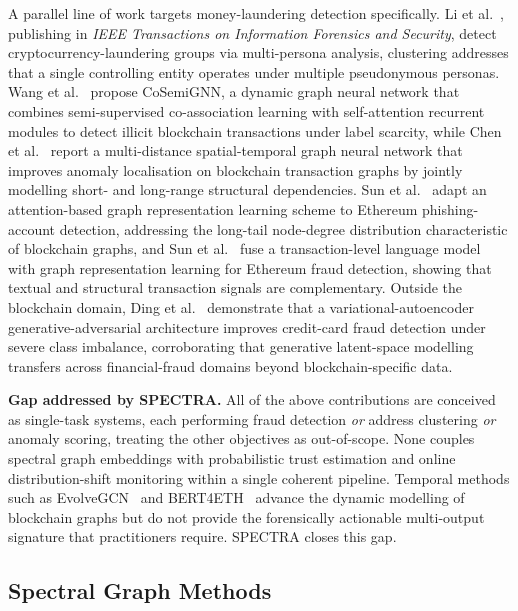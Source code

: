 \documentclass[journal]{IEEEtran}
\newcommand{\spectra}{\textsc{SPECTRA}}
\begin{document}
A parallel line of work targets money-laundering detection specifically.
Li et al.~\cite{LiG2025}, publishing in \emph{IEEE Transactions on Information
Forensics and Security}, detect cryptocurrency-laundering groups via
multi-persona analysis, clustering addresses that a single controlling entity
operates under multiple pseudonymous personas.  Wang et
al.~\cite{Wang2025} propose CoSemiGNN, a dynamic graph neural network that
combines semi-supervised co-association learning with self-attention recurrent
modules to detect illicit blockchain transactions under label scarcity, while
Chen et al.~\cite{Chen2025} report a multi-distance spatial-temporal graph
neural network that improves anomaly localisation on blockchain transaction
graphs by jointly modelling short- and long-range structural dependencies.
Sun et al.~\cite{SunH2024} adapt an attention-based graph representation
learning scheme to Ethereum phishing-account detection, addressing the
long-tail node-degree distribution characteristic of blockchain graphs, and
Sun et al.~\cite{SunJ2025} fuse a transaction-level language model with graph
representation learning for Ethereum fraud detection, showing that textual and
structural transaction signals are complementary.  Outside the blockchain
domain, Ding et al.~\cite{Ding2023} demonstrate that a variational-autoencoder
generative-adversarial architecture improves credit-card fraud detection under
severe class imbalance, corroborating that generative latent-space modelling
transfers across financial-fraud domains beyond blockchain-specific data.

\smallskip
\noindent\textbf{Gap addressed by \spectra{}.}
All of the above contributions are conceived as single-task systems, each
performing fraud detection \emph{or} address clustering \emph{or} anomaly scoring,
treating the other objectives as out-of-scope.  None couples spectral graph
embeddings with probabilistic trust estimation and online distribution-shift
monitoring within a single coherent pipeline.  Temporal methods such as
EvolveGCN~\cite{Pareja2020} and BERT4ETH~\cite{He2023} advance the dynamic
modelling of blockchain graphs but do not provide the forensically actionable
multi-output signature that practitioners require.  \spectra{} closes this gap.

\subsection{Spectral Graph Methods}
\label{subsec:spectral}
\end{document}
